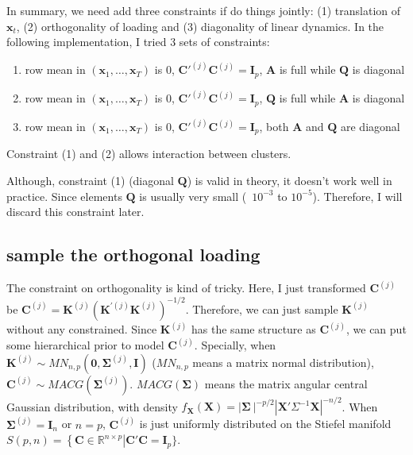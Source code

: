 \documentclass[]{article}
\begin{document}
In summary, we need add three constraints if do things jointly: (1) translation of \(\mathbf{x}_{t}\),
(2) orthogonality of loading and (3) diagonality of linear dynamics. In the following implementation, I tried 3 sets of constraints:

\begin{enumerate}
	\def\labelenumi{(\arabic{enumi})}
	\item
	row mean in \((\mathbf{x}_{1},\ldots,\mathbf{x}_{T})\) is 0,
	\(\mathbf{C}'^{(j)}\mathbf{C}^{(j)} = \mathbf{I}_{p}\), \(\mathbf{A}\) is full while \(\mathbf{Q}\) is
	diagonal
	\item
	row mean in \((\mathbf{x}_{1},\ldots,\mathbf{x}_{T})\) is 0,
	\(\mathbf{C}'^{(j)}\mathbf{C}^{(j)} = \mathbf{I}_{p}\), \(\mathbf{Q}\) is full while \(\mathbf{A}\) is
	diagonal
	\item
	row mean in \((\mathbf{x}_{1},\ldots,\mathbf{x}_{T})\) is 0,
	\(\mathbf{C}'^{(j)}\mathbf{C}^{(j)} = \mathbf{I}_{p}\), both \(\mathbf{A}\) and \(\mathbf{Q}\) are diagonal
\end{enumerate}

Constraint (1) and (2) allows interaction between clusters.

Although, constraint (1) (diagonal $\mathbf{Q}$) is valid in theory, it doesn't work well in practice. Since elements $\mathbf{Q}$ is usually very small (~$10^{-3}$ to $10^{-5}$).
Therefore, I will discard this constraint later.

\subsection{sample the orthogonal loading}
The constraint on orthogonality is kind of tricky. Here, I just transformed \(\mathbf{C}^{(j)}\) be
\(\mathbf{C}^{(j)} = \mathbf{K}^{(j)}\left( \mathbf{K}^{'(j)}\mathbf{K}^{(j)} \right)^{- 1/2}\). Therefore,
we can just sample \(\mathbf{K}^{(j)}\) without any constrained. Since
\(\mathbf{K}^{(j)}\) has the same structure as \(\mathbf{C}^{(j)}\), we can put some
hierarchical prior to model \(\mathbf{C}^{(j)}\). Specially, when
\(\mathbf{K}^{(j)} \sim MN_{n,p}(\mathbf{0},\bm{\Sigma}^{(j)},\mathbf{I})\) (\(MN_{n,p}\) means a matrix
normal distribution), \(\mathbf{C}^{(j)} \sim MACG(\bm{\Sigma}^{(j)})\).
\(MACG(\bm{\Sigma})\) means the matrix angular central Gaussian distribution,
with density
\(f_{\mathbf{X}}(\mathbf{X}) = |\bm{\Sigma}\left. \  \right|^{- p/2}{|\mathbf{X}'\Sigma^{- 1}\mathbf{X}|}^{- n/2}\).
When \(\bm{\Sigma}^{(j)} = \mathbf{I}_{n}\) or \(n = p\), \(\mathbf{C}^{(j)}\) is just
uniformly distributed on the Stiefel manifold
\(S(p,n) = \left\{ \mathbf{C} \in \mathbb{R}^{n \times p} \right|\mathbf{C}'\mathbf{C} = \mathbf{I}_{p}\}\).
\end{document}
